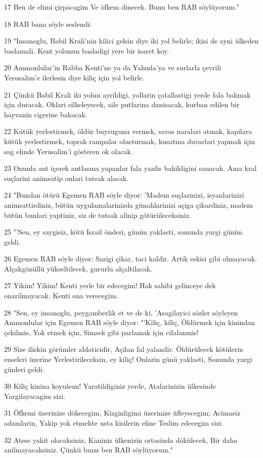 \par 17 Ben de elimi çirpacagim Ve öfkem dinecek. Bunu ben RAB söylüyorum."
\par 18 RAB bana söyle seslendi:
\par 19 "Insanoglu, Babil Krali'nin kilici gelsin diye iki yol belirle; ikisi de ayni ülkeden baslamali. Kent yolunun basladigi yere bir isaret koy.
\par 20 Ammonlular'in Rabba Kenti'ne ya da Yahuda'ya ve surlarla çevrili Yerusalim'e ilerlesin diye kiliç için yol belirle.
\par 21 Çünkü Babil Krali iki yolun ayrildigi, yollarin çatallastigi yerde fala bakmak için duracak. Oklari silkeleyecek, aile putlarina danisacak, kurban edilen bir hayvanin cigerine bakacak.
\par 22 Kütük yerlestirmek, öldür buyrugunu vermek, savas naralari atmak, kapilara kütük yerlestirmek, toprak rampalar olusturmak, kusatma duvarlari yapmak için sag elinde Yerusalim'i gösteren ok olacak.
\par 23 Onunla ant içerek antlasma yapanlar fala yanlis bakildigini sanacak. Ama kral suçlarini animsatip onlari tutsak alacak.
\par 24 "Bundan ötürü Egemen RAB söyle diyor: 'Madem suçlarinizi, isyanlarinizi animsattirdiniz, bütün uygulamalarinizda günahlarinizi açiga çikardiniz, madem bütün bunlari yaptiniz, siz de tutsak alinip götürüleceksiniz.
\par 25 "'Sen, ey saygisiz, kötü Israil önderi, günün yaklasti, sonunda yargi günün geldi.
\par 26 Egemen RAB söyle diyor: Sarigi çikar, taci kaldir. Artik eskisi gibi olmayacak. Alçakgönüllü yükseltilecek, gururlu alçaltilacak.
\par 27 Yikim! Yikim! Kenti yerle bir edecegim! Hak sahibi gelinceye dek onarilmayacak. Kenti ona verecegim.
\par 28 "Sen, ey insanoglu, peygamberlik et ve de ki, 'Asagilayici sözler söyleyen Ammonlular için Egemen RAB söyle diyor: "'Kiliç, kiliç, Öldürmek için kinindan çekilmis, Yok etmek için, Simsek gibi parlamak için cilalanmis!
\par 29 Size iliskin görümler aldaticidir, Açilan fal yalandir. Öldürülecek kötülerin enseleri üzerine Yerlestirileceksin, ey kiliç! Onlarin günü yaklasti, Sonunda yargi günleri geldi.
\par 30 Kiliç kinina koyulsun! Yaratildiginiz yerde, Atalarinizin ülkesinde Yargilayacagim sizi.
\par 31 Öfkemi üzerinize dökecegim, Kizginligimi üzerinize üfleyecegim; Acimasiz adamlarin, Yakip yok etmekte usta kisilerin eline Teslim edecegim sizi.
\par 32 Atese yakit olacaksiniz, Kaniniz ülkenizin ortasinda dökülecek, Bir daha anilmayacaksiniz. Çünkü bunu ben RAB söylüyorum."

